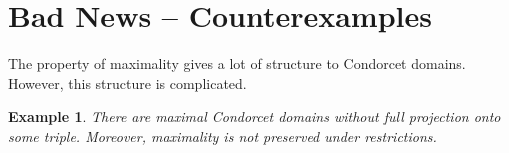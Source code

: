 \documentclass[12pt]{article}
\newtheorem{example}[theorem]{Example}
\newcommand{\1}[1]{\mathds{1}[{#1}]}
\begin{document}
\section{Bad News -- Counterexamples}

  The property of maximality gives a lot of structure to Condorcet domains.
  However, this structure is complicated.

  \begin{example}
    There are maximal Condorcet domains without full projection onto some
    triple. Moreover, maximality is not preserved under restrictions.
  \end{example}
\end{document}
